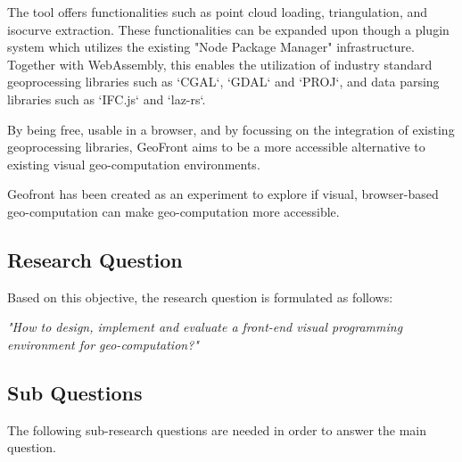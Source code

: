 The tool offers functionalities such as point cloud loading, triangulation, and isocurve extraction.
These functionalities can be expanded upon though a plugin system which utilizes the existing "Node Package Manager" infrastructure.
Together with WebAssembly, this enables the utilization of industry standard geoprocessing libraries such as `CGAL`, `GDAL` and `PROJ`, and data parsing libraries such as `IFC.js` and `laz-rs`.

By being free, usable in a browser, and by focussing on the integration of existing geoprocessing libraries, GeoFront aims to be a more accessible alternative to existing visual geo-computation environments.

Geofront has been created as an experiment to explore if visual, browser-based geo-computation can make geo-computation more accessible. 






\newpage
\subsection{Research Question}
Based on this objective, the research question is formulated as follows: 

\textit{"How to design, implement and evaluate a front-end visual programming environment for geo-computation?"}

\subsection*{Sub Questions}
The following sub-research questions are needed in order to answer the main question. 

